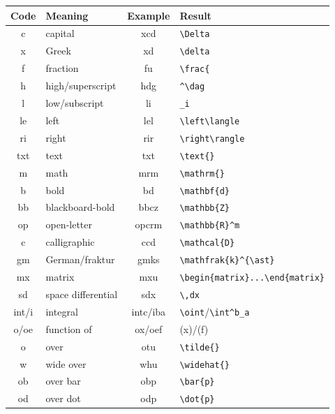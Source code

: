 \documentclass[11pt]{article}
\begin{document}
\begin{table}[tbh]
\begin{center}
  \begin{tabular}{>{\ttfamily}cl>{\ttfamily}c>{\ttfamily}l}
  \toprule
    \textnormal{Code} & Meaning & \textnormal{Example} & \textnormal{Result} \\
  \midrule
    c & capital           & xcd{}   & \verb.\Delta. \\
    x & Greek             & xd{}    & \verb.\delta. \\
    f & fraction          & fu{}    & \verb.\frac{. \\
    h & high/superscript{}& hdg{}   & \verb.^\dag. \\
    l & low/subscript{}   & li{}    & \verb._i. \\
    le& left              & lel{}   & \verb.\left\langle. \\
    ri& right             & rir{}   & \verb.\right\rangle. \\
   txt& text              & txt{}   & \verb.\text{}. \\
    m & math              & mrm{}   & \verb.\mathrm{}. \\
    b & bold{}            & bd{}    & \verb.\mathbf{d}. \\
    bb & blackboard-bold{}& bbcz{}  & \verb.\mathbb{Z}. \\
    op & open-letter      & opcrm{} & \verb.\mathbb{R}^m. \\
    c & calligraphic      & ccd{}   & \verb.\mathcal{D}. \\
    gm& German/fraktur    & gmks{}  & \verb.\mathfrak{k}^{\ast}. \\
    mx& matrix            & mxu{}   & \verb'\begin{matrix}...\end{matrix}' \\
    sd& space differential& sdx{}   & \verb.\,dx. \\
    int/i& integral       & intc/iba{} & \verb.\oint./\verb.\int^b_a. \\
    o/oe & function of    & ox/oef{}& (x)/(f) \\
    o & over              & otu{}   & \verb.\tilde{}. \\
    w & wide over         & whu{}   & \verb.\widehat{}. \\
    ob& over bar          & obp{}   & \verb.\bar{p}. \\
    od& over dot          & odp{}   & \verb.\dot{p}. \\

\end{tabular}
\end{center}
\end{table}
\end{document}
